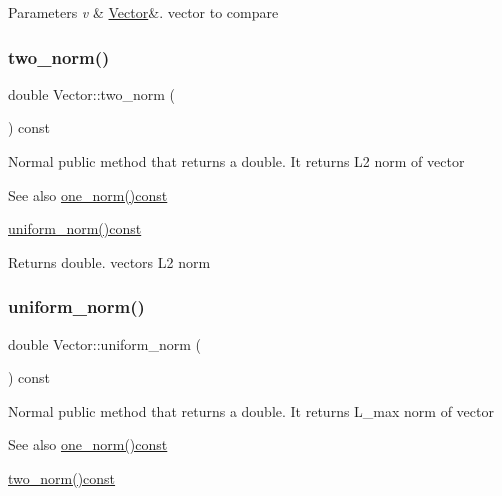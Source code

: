 \begin{DoxyParams}{Parameters}
{\em v} & \hyperlink{class_vector}{Vector}\&. vector to compare \\
\hline
\end{DoxyParams}
\mbox{\label{class_vector_a4f501290a50d057bb6c57ea64d7e70a4}} 
\subsubsection{\texorpdfstring{two\+\_\+norm()}{two\_norm()}}
{\footnotesize\ttfamily double Vector\+::two\+\_\+norm (\begin{DoxyParamCaption}{ }\end{DoxyParamCaption}) const}

Normal public method that returns a double. It returns L2 norm of vector \begin{DoxySeeAlso}{See also}
\hyperlink{class_vector_a6752a90058ddef427ca6aed12946a737}{one\+\_\+norm()const} 

\hyperlink{class_vector_a50b72131eaf3698a9876d99ab6912a32}{uniform\+\_\+norm()const} 
\end{DoxySeeAlso}
\begin{DoxyReturn}{Returns}
double. vectors L2 norm 
\end{DoxyReturn}
\mbox{\label{class_vector_a50b72131eaf3698a9876d99ab6912a32}} 
\subsubsection{\texorpdfstring{uniform\+\_\+norm()}{uniform\_norm()}}
{\footnotesize\ttfamily double Vector\+::uniform\+\_\+norm (\begin{DoxyParamCaption}{ }\end{DoxyParamCaption}) const}

Normal public method that returns a double. It returns L\+\_\+max norm of vector \begin{DoxySeeAlso}{See also}
\hyperlink{class_vector_a6752a90058ddef427ca6aed12946a737}{one\+\_\+norm()const} 

\hyperlink{class_vector_a4f501290a50d057bb6c57ea64d7e70a4}{two\+\_\+norm()const} 
\end{DoxySeeAlso}

